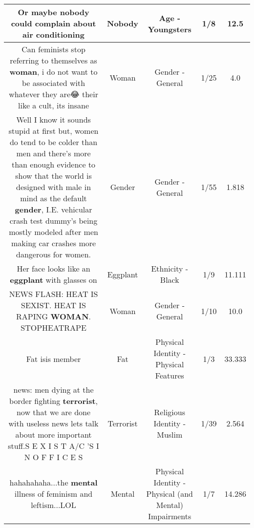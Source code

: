 \documentclass[11pt]{article}
\newlength\mylength
\begin{document}
\begin{center}
\begin{longtable}{|C{.65\mylength}|C{.30\mylength}|C{.12\mylength}|C{.12\mylength}|C{.12\mylength}|}
  \small Or maybe \textbf{nobody} could complain about air conditioning\normalsize   & Nobody & Age - Youngsters & 1/8 & 12.5 \\  \hline
  \small Can feminists stop referring to themselves as \textbf{woman}, i do not want to be associated with whatever they are😂 their like a cult, its insane\normalsize   & Woman & Gender - General & 1/25 & 4.0 \\  \hline
  \small Well I know it sounds stupid at first but, women do tend to be colder than men and there's more than enough evidence to show that the world is designed with male in mind as the default \textbf{gender}, I.E. vehicular crash test dummy's being mostly modeled after men making car crashes more dangerous for women.\normalsize   & Gender & Gender - General & 1/55 & 1.818 \\  \hline
  \small Her face looks like an \textbf{eggplant} with glasses on\normalsize   & Eggplant & Ethnicity - Black & 1/9 & 11.111 \\  \hline
  \small NEWS FLASH: HEAT IS SEXIST. HEAT IS RAPING \textbf{WOMAN}. STOPHEATRAPE\normalsize   & Woman & Gender - General & 1/10 & 10.0 \\  \hline
  \small Fat isis member\normalsize   & Fat & Physical Identity - Physical Features & 1/3 & 33.333 \\  \hline
  \small news:     men dying at the border fighting \textbf{terrorist}, now that we are done with useless news lets talk about more important stuff.S E X I S T  A/C 'S I N  O F F I C E S\normalsize   & Terrorist & Religious Identity - Muslim & 1/39 & 2.564 \\  \hline
  \small hahahahaha...the \textbf{mental} illness of feminism and leftism...LOL\normalsize   & Mental & Physical Identity - Physical (and Mental) Impairments & 1/7 & 14.286 \\  \hline

\end{longtable}
\end{center}
\end{document}
